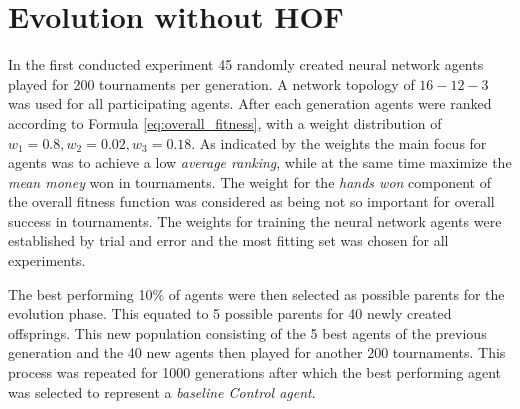 \section{Evolution without HOF}
In the first conducted experiment 45 randomly created neural network agents played for 200 tournaments per generation. A network topology of \textbf{$16-12-3$} was used for all participating agents. After each generation agents were ranked according to Formula \ref{eq:overall_fitness}, with a weight distribution of $w_1 = 0.8, w_2 = 0.02, w_3 = 0.18$. As indicated by the weights the main focus for agents was to achieve a low \textit{average ranking}, while at the same time maximize the \textit{mean money} won in tournaments. The weight for the \textit{hands won} component of the overall fitness function was considered as being not so important for overall success in tournaments. The  weights for training the neural network agents were established by trial and error and the most fitting set was chosen for all experiments.\par
The best performing 10\% of agents were then selected as possible parents for the evolution phase. This equated to 5 possible parents for 40 newly created offsprings. This new population consisting of the 5 best agents of the previous generation and the 40 new agents then played for another 200 tournaments. This process was repeated for 1000 generations after which the best performing agent was selected to represent a \textit{baseline Control agent}. \par
